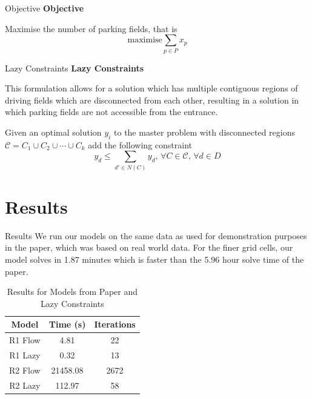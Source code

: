 \documentclass{beamer}
\begin{document}
\begin{frame}{Objective}
\textbf{Objective}\medskip

Maximise the number of parking fields, that is
$$\textrm{maximise} \sum_{p \in P} x_p$$
    
\end{frame}

\begin{frame}{Lazy Constraints}
\textbf{Lazy Constraints}\medskip

This formulation allows for a solution which has multiple contiguous regions of driving fields which are disconnected from each other, resulting in a solution in which parking fields are not accessible from the entrance. \medskip

Given an optimal solution $y_i$ to the master problem with disconnected regions $\mathcal{C} = C_1 \cup C_2 \cup \cdots \cup C_k$ add the following constraint
$$y_d \leq \sum_{d' \in N(C)} y_d, \, \forall C \in \mathcal{C}, \, \forall d \in D$$
    
\end{frame}

\section{Results}
\begin{frame}{Results}
    We run our models on the same data as used for demonstration purposes in the paper, which was based on real world data. For the finer grid cells, our model solves in 1.87 minutes which is faster than the 5.96 hour solve time of the paper.

    \begin{table}[]
        \centering
        \begin{tabular}{c|c|c}
           Model  & Time (s) & Iterations \\
             \hline
            R1 Flow &    4.81  & 22 \\
            R1 Lazy &  0.32 & 13 \\
            R2 Flow &    21458.08  & 2672 \\
            R2 Lazy &  112.97 & 58 
        \end{tabular}
        \caption{Results for Models from Paper and Lazy Constraints}
        \label{tab:my_label}
    \end{table}
\end{frame}
\end{document}
